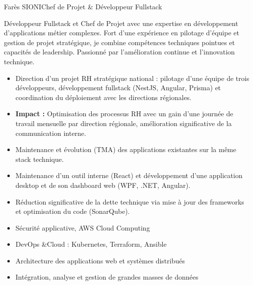 \documentclass[a4paper,11pt]{article}
\begin{document}
\begin{cv}[profile][1.9]
{Farès SIONI}{Chef de Projet \& Développeur Fullstack}

Développeur Fullstack et Chef de Projet avec une expertise en développement d'applications métier complexes.
Fort d'une expérience en pilotage d'équipe et gestion de projet stratégique, je combine compétences techniques pointues et capacités de leadership.
Passionné par l'amélioration continue et l'innovation technique.

\begin{cvevent}[08/2023][08/2025]
    \begin{itemize}
        \item Direction d'un projet RH stratégique national : pilotage d'une équipe de trois développeurs, développement fullstack (NestJS, Angular, Prisma) et coordination du déploiement avec les directions régionales.
        \item \textbf{Impact :} Optimisation des processus RH avec un gain d'une journée de travail mensuelle par direction régionale, amélioration significative de la communication interne.
        \newline
        \item Maintenance et évolution (TMA) des applications existantes sur la même stack technique.
    \end{itemize}
\end{cvevent}

\cvseparator[2]
\begin{cvevent}[06/2023][08/2023]
    \begin{itemize}
        \item Maintenance d'un outil interne (React) et développement d'une application desktop et de son dashboard web (WPF, .NET, Angular).
        \item Réduction significative de la dette technique via mise à jour des frameworks et optimisation du code (SonarQube).
    \end{itemize}
\end{cvevent}

\begin{cvevent}[2023][2025]
    \begin{itemize}
        \item Sécurité applicative, AWS Cloud Computing
        \item DevOps \&Cloud : Kubernetes, Terraform, Ansible
        \item Architecture des applications web et systèmes distribués
        \item Intégration, analyse et gestion de grandes masses de données
    \end{itemize}
\end{cvevent}


\end{cv}
\end{document}

